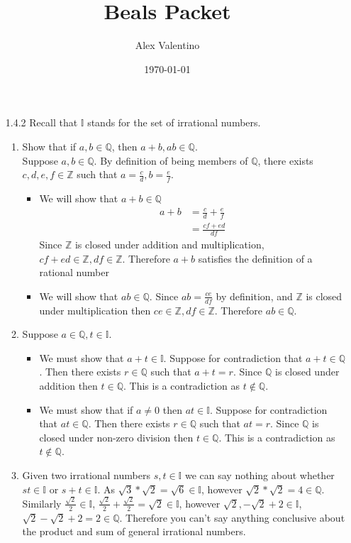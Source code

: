 \documentclass[12pt, letterpaper]{article}
\date{\today}
\author{Alex Valentino}
\title{Beals Packet}
\newcommand{\Z}{\mathbb{Z}}
\newcommand{\Q}{\mathbb{Q}}
\begin{document}
\begin{enumerate}
	\item[1.4.2] Recall that $\mathbb{I}$ stands for the set of irrational numbers.
	\begin{enumerate}
		\item Show that if $a,b \in \Q$, then $a+b, ab \in \Q$.  \\
		Suppose $a,b \in \Q$.  By definition of being members of $\Q$, there exists $c,d,e,f \in \Z$ such that $a = \frac{c}{d}, b = \frac{e}{f}$.  
		\begin{itemize}
			\item We will show that $a + b \in \Q$\\
			\begin{align*}
				a + b &= \frac{c}{d} + \frac{e}{f}\\
				&= \frac{cf + ed}{df}
			\end{align*}
			Since $\Z$ is closed under addition and multiplication, $cf + ed \in \Z, df \in \Z$.  Therefore $a+b$ satisfies the definition of a rational number
			\item We will show that $ab \in \Q$.
		Since $ab = \frac{ce}{df}$ by definition, and $\Z$ is closed under multiplication then $ce \in \Z, df \in \Z$.  Therefore $ab \in \Q$.  
\end{itemize}
	\item Suppose $a \in \Q, t \in \mathbb{I}$.
	\begin{itemize}
		\item We must show that $a + t \in \mathbb{I}$.  Suppose for contradiction that $a + t \in \Q$.  Then there exists $r \in \Q$ such that $a + t = r$.  Since $\Q$ is closed under addition then $t \in \Q$.  This is a contradiction as $t \not \in \Q$.  
		\item We must show that if $a \neq 0$ then $at \in \mathbb{I}$.  Suppose for contradiction that $at \in \Q$.  Then there exists $r \in \Q$ such that $at = r$.  Since $\Q$ is closed under non-zero division then $ t \in \Q$.  This is a contradiction as $t \not \in \Q$.  
	\end{itemize}
	\item Given two irrational numbers $s,t \in \mathbb{I}$ we can say nothing about whether $st \in \mathbb{I}$ or $s + t \in \mathbb{I}$.  As $\sqrt{3} * \sqrt{2} = \sqrt{6} \in \mathbb{I}$, however $\sqrt{2} * \sqrt{2} =  4 \in \Q$.  Similarly $\frac{\sqrt{2}}{2} \in \mathbb{I}$, $\frac{\sqrt{2}}{2} + \frac{\sqrt{2}}{2} = \sqrt{2} \in \mathbb{I}$, however $\sqrt{2}, -\sqrt{2} + 2 \in \mathbb{I}$, $\sqrt{2} -\sqrt{2} + 2 =  2 \in \Q$.  Therefore you can't say anything conclusive about the product and sum of general irrational numbers.   			 

\end{enumerate}
\end{enumerate}
\end{document}

